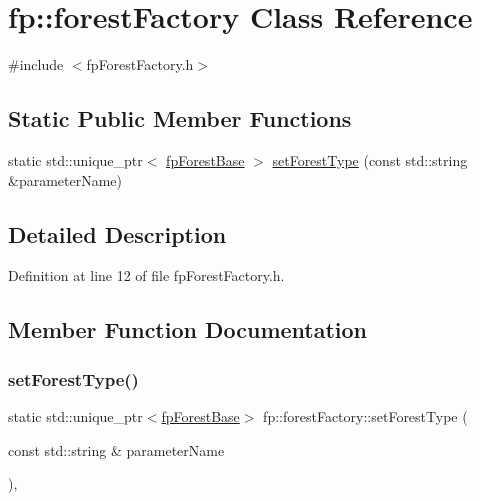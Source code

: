 \hypertarget{classfp_1_1forestFactory}{}\section{fp\+:\+:forest\+Factory Class Reference}
\label{classfp_1_1forestFactory}


{\ttfamily \#include $<$fp\+Forest\+Factory.\+h$>$}

\subsection*{Static Public Member Functions}
\begin{DoxyCompactItemize}
\item 
static std\+::unique\+\_\+ptr$<$ \hyperlink{classfp_1_1fpForestBase}{fp\+Forest\+Base} $>$ \hyperlink{classfp_1_1forestFactory_a856050d77f96dd155d41b95684552c20}{set\+Forest\+Type} (const std\+::string \&parameter\+Name)
\end{DoxyCompactItemize}


\subsection{Detailed Description}


Definition at line 12 of file fp\+Forest\+Factory.\+h.



\subsection{Member Function Documentation}
\mbox{\label{classfp_1_1forestFactory_a856050d77f96dd155d41b95684552c20}} 
\subsubsection{\texorpdfstring{set\+Forest\+Type()}{setForestType()}}
{\footnotesize\ttfamily static std\+::unique\+\_\+ptr$<$\hyperlink{classfp_1_1fpForestBase}{fp\+Forest\+Base}$>$ fp\+::forest\+Factory\+::set\+Forest\+Type (\begin{DoxyParamCaption}\item[{const std\+::string \&}]{parameter\+Name }\end{DoxyParamCaption})\hspace{0.3cm}{\ttfamily [inline]}, {\ttfamily [static]}}



